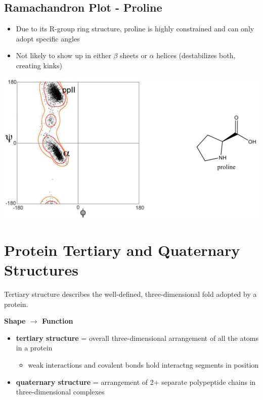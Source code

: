 \documentclass[10pt]{article}
\begin{document}
\subsection*{Ramachandron Plot - Proline}
\begin{itemize}
    \item Due to its R-group ring structure, proline is highly constrained and can only adopt specific angles
    \item Not likely to show up in either $\beta$ sheets or $\alpha$ helices (destabilizes both, creating kinks)
\end{itemize}
\begin{center}
    \includegraphics*[width=\textwidth]{L4_9.png}
\end{center}

\pagebreak
\section*{Protein Tertiary and Quaternary Structures}
Tertiary structure describes the well-defined, three-dimensional fold adopted by a protein.
\begin{center}
    \textbf{Shape $\longrightarrow$ Function}
\end{center}
\begin{itemize}
    \item \textbf{tertiary structure} = overall three-dimensional arrangement of all the atoms in a protein
    \begin{itemize}
        \item weak interactions and covalent bonds hold interactng segments in position
    \end{itemize}
    \item \textbf{quaternary structure} = arrangement of 2+ separate polypeptide chains in three-dimensional complexes
\end{itemize}
\end{document}

